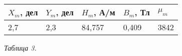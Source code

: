 \begin{center}
    \hypertarget{table3}{}

    \renewcommand{\arraystretch}{1.8}

    \begin{tabular}{|C{2.5cm}|C{2.5cm}|C{2.5cm}|C{2.5cm}|C{2.5cm}|}
        \hline
        $X_m$, дел & $Y_m$, дел & $H_m$, А/м & $B_m$, Тл & $\mu_m$  \\
        ,7 & 2,3 & 84,757 & 0,409 & 3842 \\
        \hline
    \end{tabular}

    \smallvspace

    \textit{Таблица 3.}

\end{center}